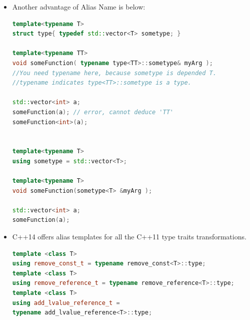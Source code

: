 \documentclass[a4paper,12pt,twoside]{book}
\begin{document}
\begin{itemize}
\item Another advantage of Alias Name is below:

\begin{lstlisting}[frame=single, language=c++]
template<typename T>
struct type{ typedef std::vector<T> sometype; }

template<typename TT>
void someFunction( typename type<TT>::sometype& myArg );
//You need typename here, because sometype is depended T.
//typename indicates type<TT>::sometype is a type.

std::vector<int> a;
someFunction(a); // error, cannot deduce 'TT'
someFunction<int>(a);


template<typename T>
using sometype = std::vector<T>;

template<typename T>
void someFunction(sometype<T> &myArg );

std::vector<int> a;
someFunction(a);
\end{lstlisting}

\item C++14 offers alias templates for all the C++11 type traits transformations.
\begin{lstlisting}[frame=single, language=c++]
template <class T>
using remove_const_t = typename remove_const<T>::type;
template <class T>
using remove_reference_t = typename remove_reference<T>::type;
template <class T>
using add_lvalue_reference_t =
typename add_lvalue_reference<T>::type;
\end{lstlisting}

\end{itemize}
\end{document}
